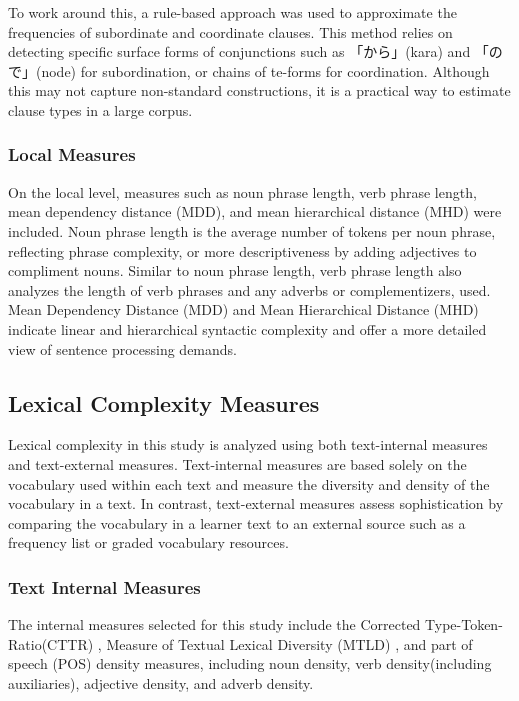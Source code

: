 To work around this, a rule-based approach was used to approximate the frequencies of subordinate and coordinate
clauses. This method relies on detecting specific surface forms of conjunctions such as 「から」(kara) and 「ので」(node)
for subordination, or chains of te-forms for coordination. Although this may not capture non-standard constructions,
it is a practical way to estimate clause types in a large corpus.

\subsubsection{Local Measures}
On the local level, measures such as noun phrase length, verb phrase length, mean dependency distance (MDD), and mean
hierarchical
distance (MHD) were included. Noun phrase length is the average number of tokens per noun phrase, reflecting phrase
complexity, or more descriptiveness by adding adjectives to compliment nouns.  Similar to noun phrase length, verb
phrase length also analyzes the length of verb phrases and any adverbs or complementizers, used.  Mean Dependency
Distance (MDD) and Mean Hierarchical Distance (MHD)
indicate linear and hierarchical syntactic complexity and offer a more detailed view of sentence processing demands.

\subsection{Lexical Complexity Measures}

Lexical complexity in this study is analyzed using both text-internal measures and
text-external measures. Text-internal measures are based solely on the vocabulary used within each text and measure the
diversity and density of the vocabulary in a text. In contrast, text-external measures assess sophistication by
comparing the vocabulary in a learner text to an external source such as a
frequency list or graded vocabulary resources.

\subsubsection{Text Internal Measures}
The internal measures selected for this study include the
Corrected Type-Token-Ratio(CTTR) \citep{Carroll1964}, Measure of Textual Lexical Diversity (MTLD) \citep{McCarthy2010}, and part of
speech (POS)
density
measures, including noun density, verb density(including auxiliaries), adjective density, and adverb density.

